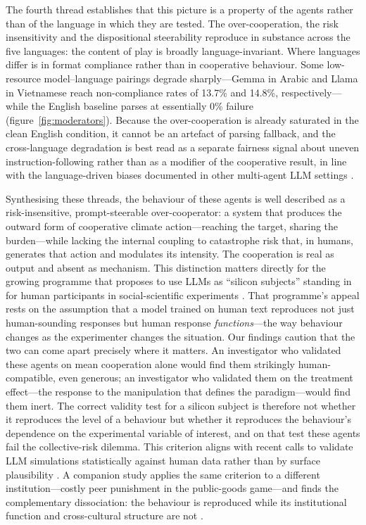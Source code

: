 \documentclass[openacc]{rsproca_new}
\begin{document}
The fourth thread establishes that this picture is a property of the agents rather than of the language in which they are tested. The over-cooperation, the risk insensitivity and the dispositional steerability reproduce in substance across the five languages: the content of play is broadly language-invariant. Where languages differ is in format compliance rather than in cooperative behaviour. Some low-resource model--language pairings degrade sharply---Gemma in Arabic and Llama in Vietnamese reach non-compliance rates of 13.7\% and 14.8\%, respectively---while the English baseline parses at essentially 0\% failure (figure~\ref{fig:moderators}). Because the over-cooperation is already saturated in the clean English condition, it cannot be an artefact of parsing fallback, and the cross-language degradation is best read as a separate fairness signal about uneven instruction-following rather than as a modifier of the cooperative result, in line with the language-driven biases documented in other multi-agent LLM settings \cite{buscemi2025communication,huynh2026payoff}.

Synthesising these threads, the behaviour of these agents is well described as a risk-insensitive, prompt-steerable over-cooperator: a system that produces the outward form of cooperative climate action---reaching the target, sharing the burden---while lacking the internal coupling to catastrophe risk that, in humans, generates that action and modulates its intensity. The cooperation is real as output and absent as mechanism. This distinction matters directly for the growing programme that proposes to use LLMs as ``silicon subjects'' standing in for human participants in social-scientific experiments \cite{argyle2023out,horton2023llm}. That programme's appeal rests on the assumption that a model trained on human text reproduces not just human-sounding responses but human response \emph{functions}---the way behaviour changes as the experimenter changes the situation. Our findings caution that the two can come apart precisely where it matters. An investigator who validated these agents on mean cooperation alone would find them strikingly human-compatible, even generous; an investigator who validated them on the treatment effect---the response to the manipulation that defines the paradigm---would find them inert. The correct validity test for a silicon subject is therefore not whether it reproduces the level of a behaviour but whether it reproduces the behaviour's dependence on the experimental variable of interest, and on that test these agents fail the collective-risk dilemma. This criterion aligns with recent calls to validate LLM simulations statistically against human data rather than by surface plausibility \cite{hullman2026validating,cummins2025threat}. A companion study applies the same criterion to a different institution---costly peer punishment in the public-goods game---and finds the complementary dissociation: the behaviour is reproduced while its institutional function and cross-cultural structure are not \cite{companionPGG2026}.
\end{document}
